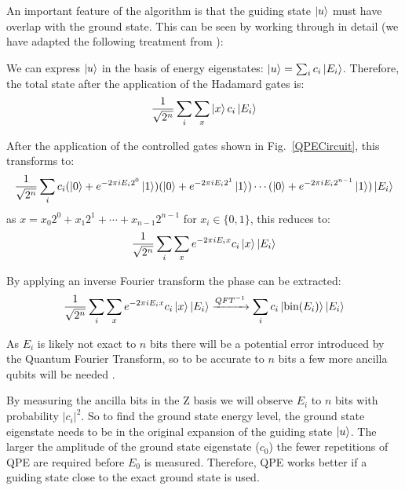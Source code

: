\documentclass[twoside]{article}
\begin{document}
An important feature of the algorithm is that the guiding state $\ket{u}$ must have overlap with the ground state. This can be seen by working through in detail (we have adapted the following treatment from \cite{chemistryReview}):\\
\begin{itemlist}
\item We can express $\ket{u}$ in the basis of energy eigenstates: $\ket{u} = \sum_i c_i \ket{E_i}$. Therefore, the total state after the application of the Hadamard gates is: 
        \begin{equation}
                \frac{1}{\sqrt{2^n}} \sum_i \sum_x \ket{x} c_i \ket{E_i}
        \end{equation}
\item After the application of the controlled gates shown in Fig.~\ref{QPECircuit}, this transforms to:
        \begin{equation}
        \frac{1}{\sqrt{2^n}} \sum_i c_i (\ket{0} + e^{-2\pi i  E_i 2^0}\ket{1})(\ket{0} + e^{-2\pi i E_i 2^1} \ket{1}) \cdots (\ket{0} + e^{-2\pi i  E_i 2^{n-1}}\ket{1}) \ket{E_i} \end{equation}
        as $x = x_0 2^0 + x_1 2^1 + \cdots + x_{n-1} 2^{n-1}$ for $x_i \in \{0,1\}$, this reduces to:
        \begin{equation}
                \frac{1}{\sqrt{2^n}} \sum_i \sum_x e^{-2\pi i E_i x}c_i \ket{x}  \ket{E_i}
        \end{equation}
\item By applying an inverse Fourier transform the phase can be extracted:
        \begin{equation}
                \frac{1}{\sqrt{2^n}} \sum_i \sum_x e^{-2\pi i E_i x}c_i \ket{x}  \ket{E_i} \xrightarrow{QFT^{-1}} \sum_i c_i \ket{\text{bin}(E_i)} \ket{E_i}
        \end{equation}
\item As $E_i$ is likely not exact to $n$ bits there will be a potential error introduced by the Quantum Fourier Transform, so to be accurate to $n$ bits a few more ancilla qubits will be needed \cite{nielsenChuang}.
\item By measuring the ancilla bits in the Z basis we will observe $E_i$ to $n$ bits with probability $|c_i|^2$.  So to find the ground state energy level, the ground state eigenstate needs to be in the original expansion of the guiding state $\ket{u}$. The larger the amplitude of the ground state eigenstate ($c_0$) the fewer repetitions of QPE are required before $E_0$ is measured. Therefore, QPE works better if a guiding state close to the exact ground state is used.
\end{itemlist}
\end{document}

